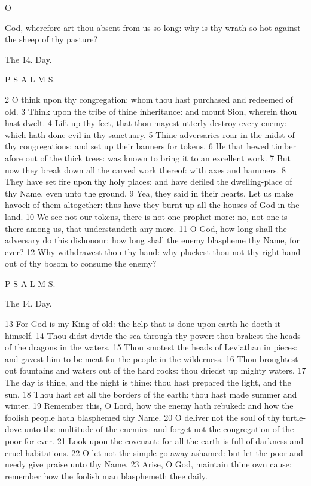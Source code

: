 O

God, wherefore art thou absent from us so long: why is thy wrath so hot against the sheep of thy pasture?

The 14. Day.

P S A L M S.

2 O think upon thy congregation: whom thou hast purchased and redeemed of old. 3 Think upon the tribe of thine inheritance: and mount Sion, wherein thou hast dwelt. 4 Lift up thy feet, that thou mayest utterly destroy every enemy: which hath done evil in thy sanctuary. 5 Thine adversaries roar in the midst of thy congregations: and set up their banners for tokens. 6 He that hewed timber afore out of the thick trees: was known to bring it to an excellent work. 7 But now they break down all the carved work thereof: with axes and hammers. 8 They have set fire upon thy holy places: and have defiled the dwelling-place of thy Name, even unto the ground. 9 Yea, they said in their hearts, Let us make havock of them altogether: thus have they burnt up all the houses of God in the land. 10 We see not our tokens, there is not one prophet more: no, not one is there among us, that understandeth any more. 11 O God, how long shall the adversary do this dishonour: how long shall the enemy blaspheme thy Name, for ever? 12 Why withdrawest thou thy hand: why pluckest thou not thy right hand out of thy bosom to consume the enemy?

P S A L M S.

The 14. Day.

13 For God is my King of old: the help that is done upon earth he doeth it himself. 14 Thou didst divide the sea through thy power: thou brakest the heads of the dragons in the waters. 15 Thou smotest the heads of Leviathan in pieces: and gavest him to be meat for the people in the wilderness. 16 Thou broughtest out fountains and waters out of the hard rocks: thou driedst up mighty waters. 17 The day is thine, and the night is thine: thou hast prepared the light, and the sun. 18 Thou hast set all the borders of the earth: thou hast made summer and winter. 19 Remember this, O Lord, how the enemy hath rebuked: and how the foolish people hath blasphemed thy Name. 20 O deliver not the soul of thy turtle-dove unto the multitude of the enemies: and forget not the congregation of the poor for ever. 21 Look upon the covenant: for all the earth is full of darkness and cruel habitations. 22 O let not the simple go away ashamed: but let the poor and needy give praise unto thy Name. 23 Arise, O God, maintain thine own cause: remember how the foolish man blasphemeth thee daily.

